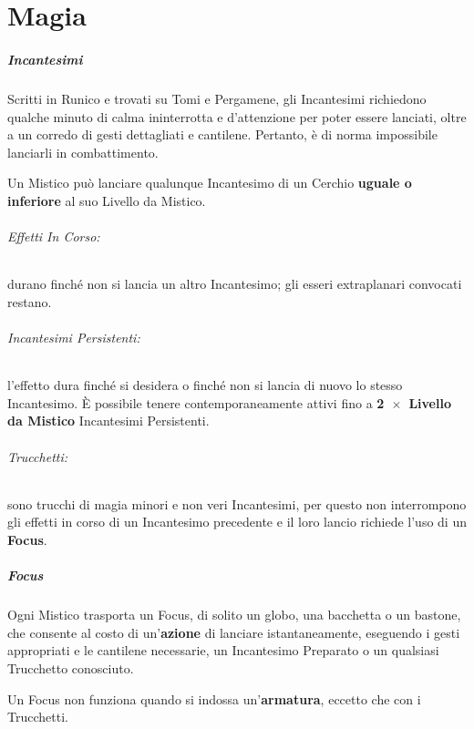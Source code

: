 \documentclass[itdr]{subfiles}
\begin{document}
\chapter{Magia}
\label{ch:magia}

\paragraph{Incantesimi}
Scritti in Runico e trovati su Tomi e Pergamene, gli Incantesimi richiedono qualche minuto di calma ininterrotta e d’attenzione per poter essere lanciati, oltre a un corredo di gesti dettagliati e cantilene. Pertanto, è di norma impossibile lanciarli in combattimento.

Un Mistico può lanciare qualunque Incantesimo di un Cerchio \textbf{uguale o inferiore} al suo Livello da Mistico.

\subparagraph{Effetti In Corso:} durano finché non si lancia un altro Incantesimo; gli esseri extraplanari convocati restano.

\subparagraph{Incantesimi Persistenti:} l'effetto dura finché si desidera o finché non si lancia di nuovo lo stesso Incantesimo. È possibile tenere contemporaneamente attivi fino a \textbf{2~$\times$~Livello da Mistico} Incantesimi Persistenti.

\subparagraph{Trucchetti:} sono trucchi di magia minori e non veri Incantesimi, per questo non interrompono gli effetti in corso di un Incantesimo precedente e il loro lancio richiede l’uso di un \textbf{Focus}.

\vfill
{}
\paragraph{Focus}
Ogni Mistico trasporta un Focus, di solito un globo, una bacchetta o un bastone, che consente al costo di un’\textbf{azione} di lanciare istantaneamente, eseguendo i gesti appropriati e le cantilene necessarie, un Incantesimo Preparato o un qualsiasi Trucchetto conosciuto.

Un Focus non funziona quando si indossa un'\textbf{armatura}, \mbox{eccetto} che con i Trucchetti.

\vfill
{}
\end{document}
